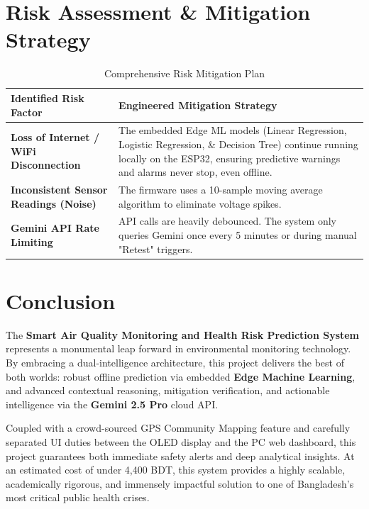 \documentclass[12pt,a4paper]{report}
\begin{document}
\chapter{Risk Assessment \& Mitigation Strategy}
\begin{table}[H]
    \centering
    \begin{tabularx}{\textwidth}{|X|X|}
        \hline
        \textbf{Identified Risk Factor} & \textbf{Engineered Mitigation Strategy} \\ \hline
        \textbf{Loss of Internet / WiFi Disconnection} & The embedded Edge ML models (Linear Regression, Logistic Regression, \& Decision Tree) continue running locally on the ESP32, ensuring predictive warnings and alarms never stop, even offline. \\ \hline
        \textbf{Inconsistent Sensor Readings (Noise)} & The firmware uses a 10-sample moving average algorithm to eliminate voltage spikes. \\ \hline
        \textbf{Gemini API Rate Limiting} & API calls are heavily debounced. The system only queries Gemini once every 5 minutes or during manual "Retest" triggers. \\ \hline
    \end{tabularx}
    \caption{Comprehensive Risk Mitigation Plan}
\end{table}

\chapter{Conclusion}
The \textbf{Smart Air Quality Monitoring and Health Risk Prediction System} represents a monumental leap forward in environmental monitoring technology. By embracing a dual-intelligence architecture, this project delivers the best of both worlds: robust offline prediction via embedded \textbf{Edge Machine Learning}, and advanced contextual reasoning, mitigation verification, and actionable intelligence via the \textbf{Gemini 2.5 Pro} cloud API.

Coupled with a crowd-sourced GPS Community Mapping feature and carefully separated UI duties between the OLED display and the PC web dashboard, this project guarantees both immediate safety alerts and deep analytical insights. At an estimated cost of under 4,400 BDT, this system provides a highly scalable, academically rigorous, and immensely impactful solution to one of Bangladesh's most critical public health crises.
\end{document}
